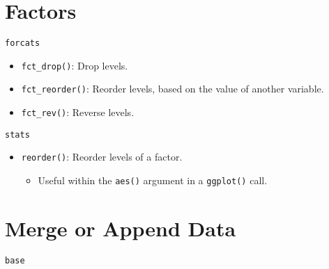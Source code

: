 \documentclass[
]{book}
\providecommand{\tightlist}{%
  \setlength{\itemsep}{0pt}\setlength{\parskip}{0pt}}
\begin{document}
\hypertarget{factors}{%
\section{Factors}\label{factors}}

\texttt{forcats}

\begin{itemize}
\tightlist
\item
  \texttt{fct\_drop()}: Drop levels.
\item
  \texttt{fct\_reorder()}: Reorder levels, based on the value of another variable.
\item
  \texttt{fct\_rev()}: Reverse levels.
\end{itemize}

\texttt{stats}

\begin{itemize}
\tightlist
\item
  \texttt{reorder()}: Reorder levels of a factor.

  \begin{itemize}
  \tightlist
  \item
    Useful within the \texttt{aes()} argument in a \texttt{ggplot()} call.
  \end{itemize}
\end{itemize}

\hypertarget{merge-or-append-data}{%
\section{Merge or Append Data}\label{merge-or-append-data}}

\texttt{base}
\end{document}
